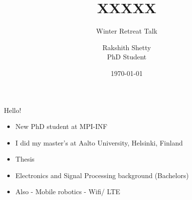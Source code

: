 \documentclass{beamer}
\begin{document}

\title{XXXXX}
\subtitle{Winter Retreat Talk}
\author[Rakshith Shetty]{Rakshith Shetty\\[4mm] {\small PhD Student}}
\date{\today}

\frame{\titlepage} 


\begin{frame}{Hello!}
  \begin{itemize}
  \item New PhD student at MPI-INF
  \item I did my master's at Aalto University, Helsinki, Finland
  \item Thesis 
  \item Electronics and Signal Processing background (Bachelors)
  \item Also
	- Mobile robotics 
	- Wifi/ LTE
  \end{itemize}
\end{frame}

\end{document}
